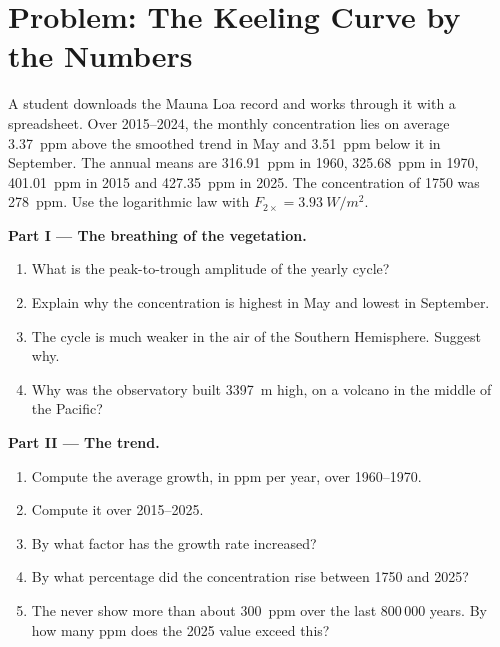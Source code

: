 \section{Problem: The Keeling Curve by the Numbers}

\begin{problem}
\label{pb:g12:climate-change:1}
A student downloads the Mauna Loa record and works through it with a
spreadsheet. Over 2015--2024, the monthly concentration lies on average
\qty{3.37}{ppm} above the smoothed trend in May and \qty{3.51}{ppm} below it
in September. The annual means are \qty{316.91}{ppm} in 1960,
\qty{325.68}{ppm} in 1970, \qty{401.01}{ppm} in 2015 and \qty{427.35}{ppm}
in 2025. The concentration of 1750 was \qty{278}{ppm}. Use the logarithmic
law with $F_{2\times} = \qty{3.93}{W/m^2}$.

\medskip
\noindent\textbf{Part I --- The breathing of the vegetation.}
\begin{enumerate}
  \item What is the peak-to-trough amplitude of the yearly cycle?
  \item Explain why the concentration is highest in May and lowest in
        September.
  \item The cycle is much weaker in the air of the Southern Hemisphere.
        Suggest why.
  \item Why was the observatory built \qty{3397}{m} high, on a volcano in the
        middle of the Pacific?
\end{enumerate}

\medskip
\noindent\textbf{Part II --- The trend.}
\begin{enumerate}[resume]
  \item Compute the average growth, in ppm per year, over 1960--1970.
  \item Compute it over 2015--2025.
  \item By what factor has the growth rate increased?
  \item By what percentage did the concentration rise between 1750 and
        2025?
  \item The  never show more than about \qty{300}{ppm} over the
        last 800\,000 years. By how many ppm does the 2025 value exceed
        this?
\end{enumerate}


\end{problem}
